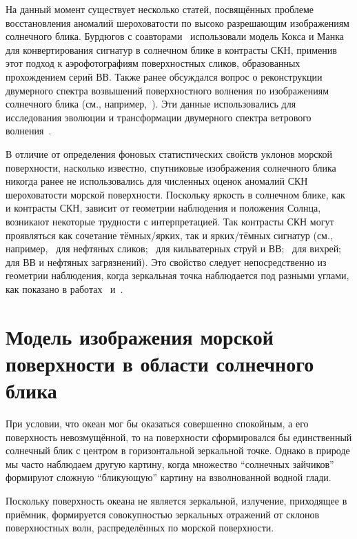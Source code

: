 На данный момент существует несколько статей, посвящённых проблеме восстановления аномалий шероховатости по высоко разрешающим изображениям солнечного блика. Бурдюгов с соавторами~\citep{Burdyugov1987} использовали модель Кокса и Манка~\citep{Cox1954} для конвертирования сигнатур в солнечном блике в контрасты СКН, применив этот подход к аэрофотографиям поверхностных сликов, образованных прохождением серий ВВ. Также ранее обсуждался вопрос о реконструкции двумерного спектра возвышений поверхностного волнения по изображениям солнечного блика (см., например,~\citep{Stilwell1969, Bolshakov1990}). Эти данные использовались для исследования эволюции и трансформации двумерного спектра ветрового волнения~\citep{Bolshakov1990a}.

В отличие от определения фоновых статистических свойств уклонов морской поверхности, насколько известно, спутниковые изображения солнечного блика никогда ранее не использовались для численных оценок аномалий СКН шероховатости морской поверхности. Поскольку яркость в солнечном блике, как и контрасты СКН, зависит от геометрии наблюдения и положения Солнца, возникают некоторые трудности с интерпретацией. Так контрасты СКН могут проявляться как сочетание тёмных/ярких, так и ярких/тёмных сигнатур (см., например,~\citep{Hu2009} для нефтяных сликов;~\citep{Matthews2005, Munk1987} для кильватерных струй и ВВ;~\citep{Munk2000} для вихрей;~\citep{Jackson2010} для ВВ и нефтяных загрязнений). Это свойство следует непосредственно из геометрии наблюдения, когда зеркальная точка наблюдается под разными углами, как показано в работах~\citep{Burdyugov1987} и~\citep{Jackson2010}.



\newpage

\section{Модель изображения морской поверхности в области солнечного блика} \label{sec:1.3}


При условии, что океан мог бы оказаться совершенно спокойным, а его поверхность невозмущённой, то на поверхности сформировался бы единственный солнечный блик с центром в горизонтальной зеркальной точке. Однако в природе мы часто наблюдаем другую картину, когда множество ``солнечных зайчиков'' формируют сложную ``бликующую'' картину на взволнованной водной глади.

Поскольку поверхность океана не является зеркальной, излучение, приходящее в приёмник, формируется совокупностью зеркальных отражений от склонов поверхностных волн, распределённых по морской поверхности.

